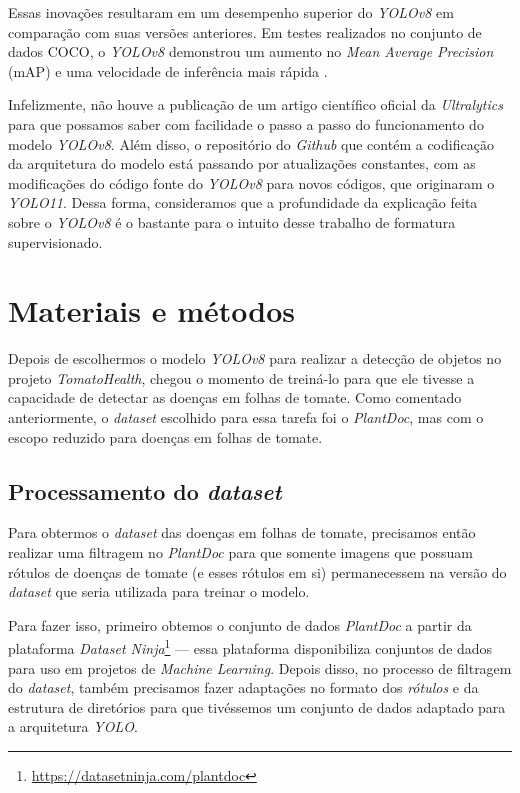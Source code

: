 Essas inovações resultaram em um desempenho superior do \emph{YOLOv8} em comparação com suas versões anteriores. Em testes realizados no conjunto de dados COCO, o \emph{YOLOv8} demonstrou um aumento no \emph{Mean Average Precision} (mAP) e uma velocidade de inferência mais rápida \citep{ultralytics_yolov8_results}.

Infelizmente, não houve a publicação de um artigo científico oficial da \emph{Ultralytics} para que possamos saber com facilidade o passo a passo do funcionamento do modelo \emph{YOLOv8}. Além disso, o repositório do \emph{Github} que contém a codificação da arquitetura do modelo está passando por atualizações constantes, com as modificações do código fonte do \emph{YOLOv8} para novos códigos, que originaram o \emph{YOLO11}. Dessa forma, consideramos que a profundidade da explicação feita sobre o \emph{YOLOv8} é o bastante para o intuito desse trabalho de formatura supervisionado.


\section{Materiais e métodos}
\label{sec:treinamento}
Depois de escolhermos o modelo \emph{YOLOv8} para realizar a detecção de objetos no projeto \emph{TomatoHealth}, chegou o momento de treiná-lo para que ele tivesse a capacidade de detectar as doenças em folhas de tomate. Como comentado anteriormente, o \emph{dataset} escolhido para essa tarefa foi o \emph{PlantDoc}, mas com o escopo reduzido para doenças em folhas de tomate.

\subsection{Processamento do \emph{dataset}}
Para obtermos o \emph{dataset} das doenças em folhas de tomate, precisamos então realizar uma filtragem no \emph{PlantDoc} para que somente imagens que possuam rótulos de doenças de tomate (e esses rótulos em si) permanecessem na versão do \emph{dataset} que seria utilizada para treinar o modelo.

Para fazer isso, primeiro obtemos o conjunto de dados \emph{PlantDoc} a partir da plataforma \emph{Dataset Ninja}\footnote{\url{https://datasetninja.com/plantdoc}} --- essa plataforma disponibiliza conjuntos de dados para uso em projetos de \emph{Machine Learning}. Depois disso, no processo de filtragem do \emph{dataset}, também precisamos fazer adaptações no formato dos \emph{rótulos} e da estrutura de diretórios para que tivéssemos um conjunto de dados adaptado para a arquitetura \emph{YOLO}.

